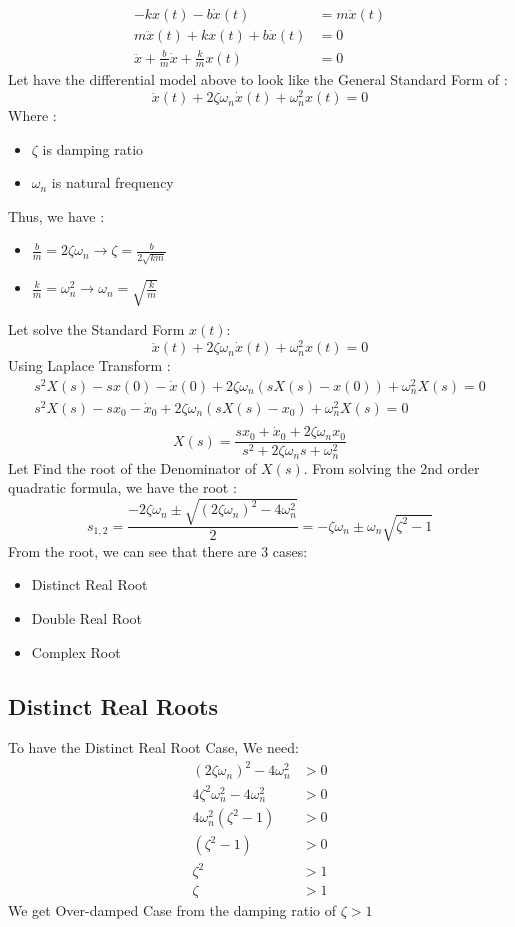 \documentclass[12pt,a4paper]{article}
\begin{document}
	\[
	\begin{split}
		-kx(t) - b\dot{x}(t) &= m\ddot{x}(t) \\
		m\ddot{x}(t) + kx(t) + b\dot{x}(t)&= 0 \\
		\ddot{x} + \frac{b}{m} \dot{x}+\frac{k}{m} x(t) &= 0
	\end{split}
	\]
	Let have the differential model above to look like the General Standard Form of :
	\[
	\boxed{\ddot{x}(t)+2\zeta\omega_n\dot{x}(t)+\omega_n^2x(t)=0}
	\]
	Where :
	\begin{itemize}
		\item $ \zeta $ is damping ratio
		\item $ \omega_n $ is natural frequency
	\end{itemize}
	Thus, we have :
	\begin{itemize}
		\item $ \frac{b}{m} = 2\zeta\omega_n \rightarrow \zeta = \frac{b}{2\sqrt{km}}$ 
		\item $ \frac{k}{m} = \omega_n^2 \rightarrow \omega_n = \sqrt{\frac{k}{m}}$
	\end{itemize}
	Let solve the Standard Form $ x(t) $:
	\[ 
	\ddot{x}(t)+2\zeta\omega_n\dot{x}(t)+\omega_n^2x(t)=0 
	\]
	Using Laplace Transform :
	\[ 
	\begin{split}
		s^2 X(s) - sx(0) -  \dot{x}(0) + 2\zeta\omega_n(sX(s)-x(0)) + \omega_n^2X(s) = 0 \\
		s^2 X(s) - sx_0 -  \dot{x}_0 + 2\zeta\omega_n(sX(s)-x_0) + \omega_n^2X(s) = 0 \\
	\end{split}
	\]
	\[ 
	X(s) = \frac{sx_0 + \dot{x}_0 + 2\zeta\omega_nx_0}{s^2 + 2\zeta\omega_ns+\omega_n^2}
	\]
	Let Find the root of the Denominator of $ X(s) $. From solving the 2nd order quadratic formula, we have the root :
	\[ 
	s_{1,2} = \frac{-2\zeta\omega_n \pm \sqrt{(2\zeta\omega_n)^2 - 4\omega_n^2}}{2} = -\zeta\omega_n \pm \omega_n\sqrt{\zeta^2-1}
	\]
	From the root, we can see that there are 3 cases:
	\begin{itemize}
		\item Distinct Real Root
		\item Double Real Root
		\item Complex Root
	\end{itemize}
	
	
	\subsection{Distinct Real Roots}
	To have the Distinct Real Root Case, We need:
	\[ 
	\begin{split}
		(2\zeta\omega_n)^2 - 4\omega_n^2 &> 0 \\
		4\zeta^2\omega_n^2 - 4\omega_n^2 &> 0 \\
		4\omega_n^2 (\zeta^2 - 1) &> 0 \\
		(\zeta^2 - 1) &> 0 \\
		\zeta^2  &> 1 \\
		\zeta &> 1
	\end{split}
	\]
	We get Over-damped Case from the damping ratio of $ \boxed{\zeta > 1} $
	
\end{document}
